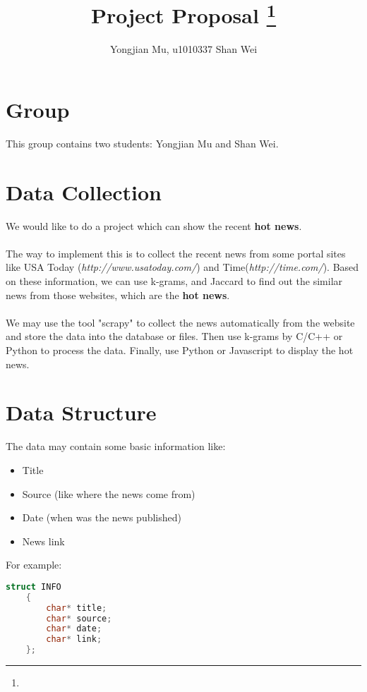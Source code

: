 \documentclass[11pt]{article}
\title{Project Proposal
\footnote{\s{CS 6140; \;\; Spring 2016 \hfill
Instructor: Jeff M. Phillips, University of Utah}
}
}
\author{Yongjian Mu, u1010337 \qquad Shan Wei}
\begin{document}
\maketitle





\section{Group}
This group contains two students: Yongjian Mu and Shan Wei.

\section{Data Collection}
We would like to do a project which can show the recent \textbf{hot news}.\\
\\
The way to implement this is to collect the recent news from some portal sites like USA Today (\textit{http://www.usatoday.com/}) and Time(\textit{http://time.com/}). Based on these information, we can use k-grams, and Jaccard to find out the similar news from those websites, which are the \textbf{hot news}.\\
\\
We may use the tool "scrapy" to collect the news automatically from the website and store the data into the database or files. Then use k-grams by C/C++ or Python to process the data. Finally, use Python or Javascript to display the hot news.

\section{Data Structure}
The data may contain some basic information like:
\begin{itemize}
\item Title
\item Source (like where the news come from)
\item Date (when was the news published)
\item News link
\end{itemize}

For example:
\begin{lstlisting}[language=C]
    struct INFO
    {
	    char* title;
	    char* source;
	    char* date;
	    char* link;
    };
\end{lstlisting}
\end{document}
